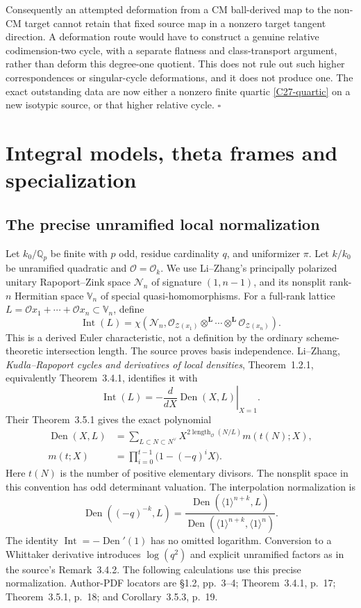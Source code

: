 \documentclass[11pt]{article}
\newcommand{\Q}{\mathbb Q}\newcommand{\C}{\mathbb C}\newcommand{\Z}{\mathbb Z}\newcommand{\R}{\mathbb R}\newcommand{\A}{\mathbb A}\newcommand{\OO}{\mathcal O}
\theoremstyle{definition}\newtheorem{definition}[theorem]{Definition}\newtheorem{remark}[theorem]{Remark}
\begin{document}
Consequently an attempted deformation from a CM
ball-derived map to the non-CM target cannot retain
that fixed source map in a nonzero target tangent
direction.  A deformation route would have to
construct a genuine relative codimension-two cycle,
with a separate flatness and class-transport argument,
rather than deform this degree-one quotient.  This
does not rule out such higher correspondences or
singular-cycle deformations, and it does not produce
one.  The exact outstanding data are now either
a nonzero finite quartic \eqref{C27-quartic} on a
new isotypic source, or that higher relative cycle.
\hfill$\square$


\section{Integral models, theta frames and specialization}

\subsection{The precise unramified local normalization}

Let $k_0/\Q_p$ be finite with $p$ odd, residue cardinality $q$, and
uniformizer $\pi$. Let $k/k_0$ be unramified quadratic and
$\mathcal O=\mathcal O_k$. We use Li--Zhang's principally polarized
unitary Rapoport--Zink space $\mathcal N_n$ of signature $(1,n-1)$,
and its nonsplit rank-$n$ Hermitian space $\mathbb V_n$ of special
quasi-homomorphisms. For a full-rank lattice
$L=\mathcal O x_1+\cdots+\mathcal O x_n\subset\mathbb V_n$, define
\[
 \operatorname{Int}(L)=\chi\left(\mathcal N_n,
  \mathcal O_{\mathcal Z(x_1)}\otimes^{\mathbf L}\cdots
                    \otimes^{\mathbf L}\mathcal O_{\mathcal Z(x_n)}\right).
\]
This is a derived Euler characteristic, not a definition by the
ordinary scheme-theoretic intersection length. The source proves
basis independence. Li--Zhang, \emph{Kudla--Rapoport cycles and
derivatives of local densities}, Theorem~1.2.1, equivalently
Theorem~3.4.1, identifies it with
\[
 \operatorname{Int}(L)=-\left.\frac{d}{dX}
                           \operatorname{Den}(X,L)\right|_{X=1}.
\]
Their Theorem~3.5.1 gives the exact polynomial
\begin{align*}
 \operatorname{Den}(X,L)
 &=\sum_{L\subset N\subset N^\vee}
      X^{2\operatorname{length}_{\mathcal O}(N/L)}m(t(N);X),\\
 m(t;X)&=\prod_{i=0}^{t-1}\bigl(1-(-q)^iX\bigr).
\end{align*}
Here $t(N)$ is the number of positive elementary divisors. The
nonsplit space in this convention has odd determinant valuation.
The interpolation normalization is
\[
 \operatorname{Den}((-q)^{-k},L)
 =\frac{\operatorname{Den}(\langle1\rangle^{n+k},L)}
        {\operatorname{Den}(\langle1\rangle^{n+k},\langle1\rangle^n)}.
\]
The identity $\operatorname{Int}=-\operatorname{Den}'(1)$ has no
omitted logarithm. Conversion to a Whittaker derivative introduces
$\log(q^2)$ and explicit unramified factors as in the source's
Remark~3.4.2. The following calculations use this precise
normalization. Author-PDF locators are \S1.2, pp.~3--4;
Theorem~3.4.1, p.~17; Theorem~3.5.1, p.~18; and
Corollary~3.5.3, p.~19.
\end{document}
